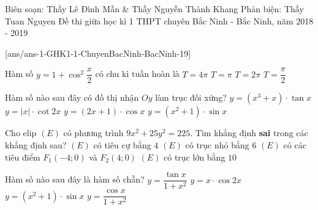 \begin{name}
	{Biên soạn: Thầy Lê Đình Mẫn \& Thầy Nguyễn Thành Khang   Phản biện: Thầy Tuan Nguyen}
	{Đề thi giữa học kì 1 THPT chuyên Bắc Ninh - Bắc Ninh, năm 2018 - 2019}
\end{name}
\setcounter{ex}{0}\setcounter{bt}{0}
[ans/ans-1-GHK1-1-ChuyenBacNinh-BacNinh-19]
\begin{ex}%
Hàm số $y=1+\cos^2\dfrac{x}{2}$ có chu kì tuần hoàn là
\choice
{$T=4\pi$}
{\True $T=\pi$}
{$T=2\pi$}
{$T=\dfrac{\pi}{2}$}
\end{ex}

\begin{ex}%
Hàm số nào sau đây có đồ thị nhận $Oy$ làm trục đối xứng?
\choice
{\True $y=(x^3+x)\cdot\tan x$}
{$y=|x|\cdot\cot 2x$}
{$y=(2x+1)\cdot\cos x$}
{$y=(x^2+1)\cdot\sin x$}
\end{ex}

\begin{ex}%
Cho elip $(E)$ có phương trình $9x^2+25y^2=225$. Tìm khẳng định \textbf{sai} trong các khẳng định sau?
\choice
	{\True $(E)$ có tiêu cự bằng $4$}
	{$(E)$ có trục nhỏ bằng $6$}
	{$(E)$ có các tiêu điểm $F_1(-4;0)$ và $F_2(4;0)$}
	{$(E)$ có trục lớn bằng $10$}
\end{ex}

\begin{ex}%
Hàm số nào sau đây là hàm số chẵn?
\choice
{$y=\dfrac{\tan x}{1+x^2}$}
{$y=x\cdot\cos 2x$}
{$y=(x^2+1)\cdot\sin x$}
{\True $y=\dfrac{\cos x}{1+x^2}$}
\end{ex}

